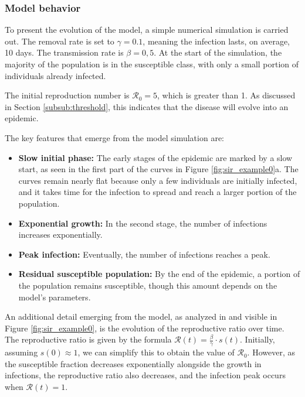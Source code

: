 \subsubsection{Model behavior}

To present the evolution of the model, a simple numerical simulation is carried out. The removal rate is set to $\gamma = 0.1$, meaning the infection lasts, on average, 10 days. The transmission rate is $\beta = 0,5$. At the start of the simulation, the majority of the population is in the susceptible class, with only a small portion of individuals already infected.

The initial reproduction number is  $\mathcal{R}_0 = 5$, which is greater than 1. As discussed in Section \ref{subsub:threshold}, this indicates that the disease will evolve into an epidemic.

The key features that emerge from the model simulation are:

\begin{itemize}
	\item \textbf{Slow initial phase:} The early stages of the epidemic are marked by a slow start, as seen in the first part of the curves in Figure \ref{fig:sir_example0}a. The curves remain nearly flat because only a few individuals are initially infected, and it takes time for the infection to spread and reach a larger portion of the population.
	\item \textbf{Exponential growth:} In the second stage, the number of infections increases exponentially.
	\item \textbf{Peak infection:} Eventually, the number of infections reaches a peak.
	\item \textbf{Residual susceptible population:} By the end of the epidemic, a portion of the population remains susceptible, though this amount depends on the model's parameters.
\end{itemize}

An additional detail emerging from the model, as analyzed in \cite{Okabe_2020} and visible in Figure \ref{fig:sir_example0}, is the evolution of the reproductive ratio over time. The reproductive ratio is given by the formula $\mathcal{R}(t) = \frac{\beta}{\gamma} \cdot s(t)$. Initially, assuming $s(0)\approx 1$, we can simplify this to obtain the value of $\mathcal{R}_0$. However, as the susceptible fraction decreases exponentially alongside the growth in infections, the reproductive ratio also decreases, and the infection peak occurs when $\mathcal{R}(t)=1$.


